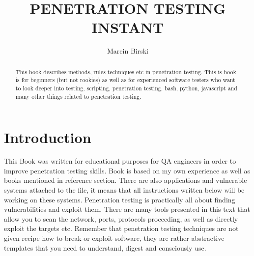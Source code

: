 \documentclass{article}[12pt]
\title{\huge{PENETRATION TESTING INSTANT}}
\author{Marcin Birski}
\begin{document}
\begin{center}
\maketitle
\newpage
\end{center}

\begin{abstract}

This book describes methods, rules techniques etc in penetration testing.
    This is book is for beginners (but not rookies) as well as for experienced software testers who want to look deeper into testing, scripting, penetration testing, bash, python, javascript and many other things related to penetration testing.
\end{abstract}


\tableofcontents
\newpage





\section{Introduction}
This Book was written for educational purposes for QA engineers in order to improve penetration testing skills.
Book is based on my own experience as well as books mentioned in reference section.
There are also applications and vulnerable systems attached to the file, it means that all instructions written below will be working on these systems.
Penetration testing is practically all about finding vulnerabilities and exploit them.
There are many tools presented in this text that allow you to scan the network, ports, protocols proceeding, as well as directly exploit the targets etc.
Remember that penetration testing techniques are not given recipe how to break or exploit software, they are rather abstractive templates that you need to understand, digest and consciously use.
\end{document}
